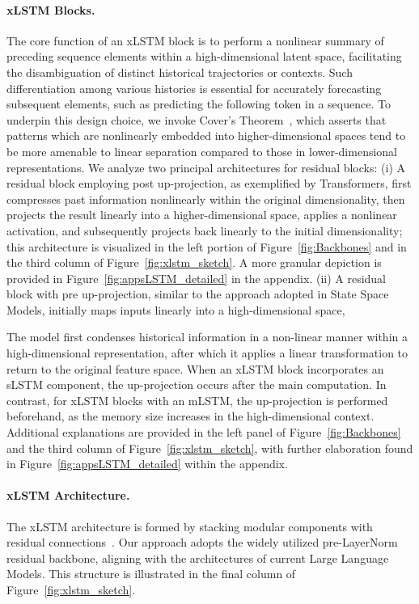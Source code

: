 \paragraph{xLSTM Blocks.}
\label{sec:xLSTMblock}
The core function of an xLSTM block is to perform a nonlinear summary of preceding sequence elements within a high-dimensional latent space, facilitating the disambiguation of distinct historical trajectories or contexts. Such differentiation among various histories is essential for accurately forecasting subsequent elements, such as predicting the following token in a sequence. To underpin this design choice, we invoke Cover’s Theorem~\citep{Cover:65}, which asserts that patterns which are nonlinearly embedded into higher-dimensional spaces tend to be more amenable to linear separation compared to those in lower-dimensional representations. We analyze two principal architectures for residual blocks: (i) A residual block employing post up-projection, as exemplified by Transformers, first compresses past information nonlinearly within the original dimensionality, then projects the result linearly into a higher-dimensional space, applies a nonlinear activation, and subsequently projects back linearly to the initial dimensionality; this architecture is visualized in the left portion of Figure~\ref{fig:Backbones} and in the third column of Figure~\ref{fig:xlstm_sketch}. A more granular depiction is provided in Figure~\ref{fig:appsLSTM_detailed} in the appendix. (ii) A residual block with pre up-projection, similar to the approach adopted in State Space Models, initially maps inputs linearly into a high-dimensional space,

The model first condenses historical information in a non-linear manner within a high-dimensional representation, after which it applies a linear transformation to return to the original feature space. When an xLSTM block incorporates an sLSTM component, the up-projection occurs after the main computation. In contrast, for xLSTM blocks with an mLSTM, the up-projection is performed beforehand, as the memory size increases in the high-dimensional context. Additional explanations are provided in the left panel of Figure~\ref{fig:Backbones} and the third column of Figure~\ref{fig:xlstm_sketch}, with further elaboration found in Figure~\ref{fig:appsLSTM_detailed} within the appendix.

\paragraph{xLSTM Architecture. }
\label{sec:xLSTMarchitecure}
The xLSTM architecture is formed by stacking modular components with residual connections~\citep{Srivastava:15,He:16}. Our approach adopts the widely utilized pre-LayerNorm~\citep{Ba:16b} residual backbone, aligning with the architectures of current Large Language Models. This structure is illustrated in the final column of Figure~\ref{fig:xlstm_sketch}.

